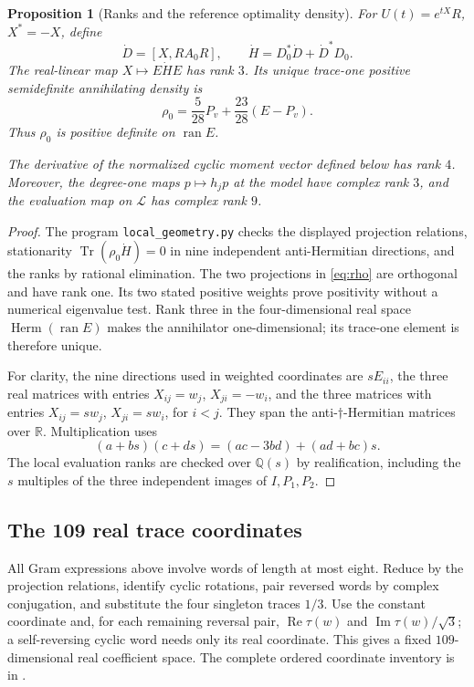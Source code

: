 \documentclass[11pt]{article}
\newtheorem{proposition}[theorem]{Proposition}
\theoremstyle{remark}\newtheorem{remark}[theorem]{Remark}
\newcommand{\R}{\mathbb R}
\newcommand{\Q}{\mathbb Q}
\newcommand{\Tr}{\operatorname{Tr}}
\newcommand{\Herm}{\operatorname{Herm}}
\newcommand{\ran}{\operatorname{ran}}
\newcommand{\Lwords}{\mathcal L}
\begin{document}
\begin{proposition}[Ranks and the reference optimality density]\label{prop:geometry}
For $U(t)=e^{tX}R$, $X^*=-X$, define
\[
 \dot D=[X,RA_0R],\qquad
 \dot H=D_0^*\dot D+\dot D^*D_0.
\]
The real-linear map $X\mapsto E\dot H E$ has rank $3$. Its unique trace-one positive semidefinite annihilating density is
\begin{equation}\label{eq:rho}
 \rho_0=\frac5{28}P_v+\frac{23}{28}(E-P_v).
\end{equation}
Thus $\rho_0$ is positive definite on $\ran E$.

The derivative of the normalized cyclic moment vector defined below has rank $4$. Moreover, the degree-one maps $p\mapsto h_jp$ at the model have complex rank $3$, and the evaluation map on $\Lwords$ has complex rank $9$.
\end{proposition}
\begin{proof}
The program \texttt{local\_geometry.py} checks the displayed projection relations, stationarity $\Tr(\rho_0\dot H)=0$ in nine independent anti-Hermitian directions, and the ranks by rational elimination. The two projections in \eqref{eq:rho} are orthogonal and have rank one. Its two stated positive weights prove positivity without a numerical eigenvalue test. Rank three in the four-dimensional real space $\Herm(\ran E)$ makes the annihilator one-dimensional; its trace-one element is therefore unique.

For clarity, the nine directions used in weighted coordinates are $sE_{ii}$, the three real matrices with entries $X_{ij}=w_j$, $X_{ji}=-w_i$, and the three matrices with entries $X_{ij}=sw_j$, $X_{ji}=sw_i$, for $i<j$. They span the anti-$\dagger$-Hermitian matrices over $\R$. Multiplication uses
\[
 (a+bs)(c+ds)=(ac-3bd)+(ad+bc)s.
\]
The local evaluation ranks are checked over $\Q(s)$ by realification, including the $s$ multiples of the three independent images of $I,P_1,P_2$.
\end{proof}

\subsection{The 109 real trace coordinates}
All Gram expressions above involve words of length at most eight. Reduce by the projection relations, identify cyclic rotations, pair reversed words by complex conjugation, and substitute the four singleton traces $1/3$. Use the constant coordinate and, for each remaining reversal pair, $\operatorname{Re}\tau(w)$ and $\operatorname{Im}\tau(w)/\sqrt3$; a self-reversing cyclic word needs only its real coordinate. This gives a fixed $109$-dimensional real coefficient space. The complete ordered coordinate inventory is in .
\end{document}
